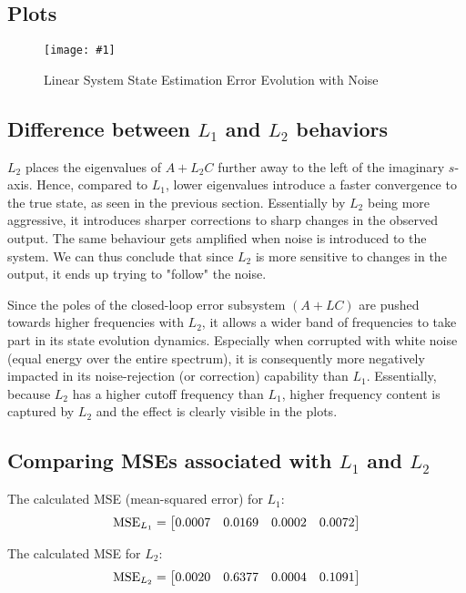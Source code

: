 \documentclass[10pt]{article}
\newcommand{\shrinkimage}[1]{\texttt{[image: \#1]}}
\begin{document}
\subsection{Plots}
\begin{figure}[h!]
    \centering
    \shrinkimage{lin_noisy_state_est_error.pdf}
    \caption{Linear System State Estimation Error Evolution with Noise}
    \label{fig:lin_noisy_state_est_error}
\end{figure}

\subsection{Difference between \texorpdfstring{$L_1$}{L1} and \texorpdfstring{$L_2$}{L2} behaviors}
$L_2$ places the eigenvalues of $A+L_2C$ further away to the left of the imaginary $s$-axis. Hence, compared to $L_1$, lower eigenvalues introduce a faster convergence to the true state, as seen in the previous section. Essentially by $L_2$ being more aggressive, it introduces sharper corrections to sharp changes in the observed output. The same behaviour gets amplified when noise is introduced to the system. We can thus conclude that since $L_2$ is more sensitive to changes in the output, it ends up trying to "follow" the noise.

Since the poles of the closed-loop error subsystem $(A+LC)$ are pushed towards higher frequencies with $L_2$, it allows a wider band of frequencies to take part in its state evolution dynamics. Especially when corrupted with white noise (equal energy over the entire spectrum), it is consequently more negatively impacted in its noise-rejection (or correction) capability than $L_1$. Essentially, because $L_2$ has a higher cutoff frequency than $L_1$, higher frequency content is captured by $L_2$ and the effect is clearly visible in the plots. 

\subsection{Comparing MSEs associated with \texorpdfstring{$L_1$}{L1} and \texorpdfstring{$L_2$}{L2}}
The calculated MSE (mean-squared error) for $L_1$:
\begin{equation*}
    \text{MSE}_{L_1} = \begin{bmatrix} 0.0007  &  0.0169  &  0.0002  &  0.0072 \end{bmatrix}
\end{equation*}

The calculated MSE for $L_2$:
\begin{equation*}
    \text{MSE}_{L_2} = \begin{bmatrix} 0.0020 &  0.6377 &   0.0004  &  0.1091 \end{bmatrix}
\end{equation*} 
\end{document}
